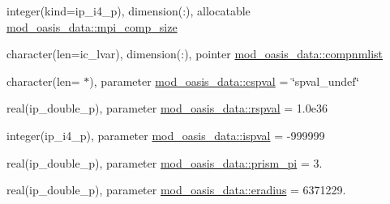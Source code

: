 \begin{DoxyCompactItemize}
\item 
integer(kind=ip\+\_\+i4\+\_\+p), dimension(\+:), allocatable \hyperlink{namespacemod__oasis__data_aac77b331ab5a1af2e2443d6e83c755e4}{mod\+\_\+oasis\+\_\+data\+::mpi\+\_\+comp\+\_\+size}
\item 
character(len=ic\+\_\+lvar), dimension(\+:), pointer \hyperlink{namespacemod__oasis__data_a8127239627205ac7d60ce6358e6028ae}{mod\+\_\+oasis\+\_\+data\+::compnmlist}
\item 
character(len= $\ast$), parameter \hyperlink{namespacemod__oasis__data_acfb160b3d147e7cb667b0dc0f5bb2960}{mod\+\_\+oasis\+\_\+data\+::cspval} = \char`\"{}spval\+\_\+undef\char`\"{}
\item 
real(ip\+\_\+double\+\_\+p), parameter \hyperlink{namespacemod__oasis__data_a3fea2837639caadabd693f405693edbb}{mod\+\_\+oasis\+\_\+data\+::rspval} = 1.\+0e36
\item 
integer(ip\+\_\+i4\+\_\+p), parameter \hyperlink{namespacemod__oasis__data_a66bd35eca1454b6d8c8ac0449f2ca475}{mod\+\_\+oasis\+\_\+data\+::ispval} = -\/999999
\item 
real(ip\+\_\+double\+\_\+p), parameter \hyperlink{namespacemod__oasis__data_ad5c84ea4b3063c2a3883b6d6571afeb0}{mod\+\_\+oasis\+\_\+data\+::prism\+\_\+pi} = 3.
\item 
real(ip\+\_\+double\+\_\+p), parameter \hyperlink{namespacemod__oasis__data_a7f361db125e5554d0427e964b698f10c}{mod\+\_\+oasis\+\_\+data\+::eradius} = 6371229.
\end{DoxyCompactItemize}
